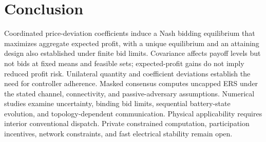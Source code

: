 \documentclass[journal]{IEEEtran}
\begin{document}
\section{Conclusion}

Coordinated price-deviation coefficients induce a Nash bidding equilibrium that maximizes aggregate expected profit, with a unique equilibrium and an attaining design also established under finite bid limits. Covariance affects payoff levels but not bids at fixed means and feasible sets; expected-profit gains do not imply reduced profit risk. Unilateral quantity and coefficient deviations establish the need for controller adherence. Masked consensus computes uncapped ERS under the stated channel, connectivity, and passive-adversary assumptions. Numerical studies examine uncertainty, binding bid limits, sequential battery-state evolution, and topology-dependent communication. Physical applicability requires interior conventional dispatch. Private constrained computation, participation incentives, network constraints, and fast electrical stability remain open.



\end{document}
